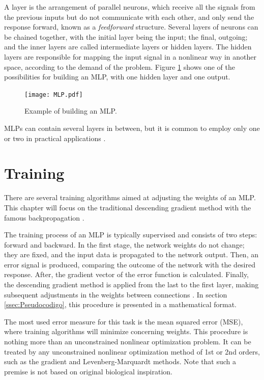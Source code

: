 A layer is the arrangement of parallel neurons, which receive all the signals from the previous inputs but do not communicate with each other, and only send the response forward, known as a \textit{feedforward} structure. Several layers of neurons can be chained together, with the initial layer being the input; the final, outgoing; and the inner layers are called intermediate layers or hidden layers. The hidden layers are responsible for mapping the input signal in a nonlinear way in another space, according to the demand of the problem. Figure \ref{fig:mlp} shows one of the possibilities for building an MLP, with one hidden layer and one output.

\begin{figure}[h!]
    \centering
    \caption{Example of building an MLP.}
    \vspace{0.2cm}
    \texttt{[image: MLP.pdf]}
    \label{fig:mlp}
\end{figure}

MLPs can contain several layers in between, but it is common to employ only one or two in practical applications \cite{haykin}.

\section{Training}
\label{ssec:treino}

There are several training algorithms aimed at adjusting the weights of an MLP. This chapter will focus on the traditional descending gradient method with the famous backpropagation \cite{rumelhart1986learning}.

The training process of an MLP is typically supervised and consists of two steps: forward and backward. In the first stage, the network weights do not change; they are fixed, and the input data is propagated to the network output. Then, an error signal is produced, comparing the outcome of the network with the desired response. After, the gradient vector of the error function is calculated. Finally, the descending gradient method is applied from the last to the first layer, making subsequent adjustments in the weights between connections \cite{haykin}. In section \ref{ssec:Pseudocodigo}, this procedure is presented in a mathematical format.

The most used error measure for this task is the mean squared error (MSE), where training algorithms will minimize concerning weights. This procedure is nothing more than an unconstrained nonlinear optimization problem. It can be treated by any unconstrained nonlinear optimization method of 1st or 2nd orders, such as the gradient and Levenberg-Marquardt methods. Note that such a premise is not based on original biological inspiration.

